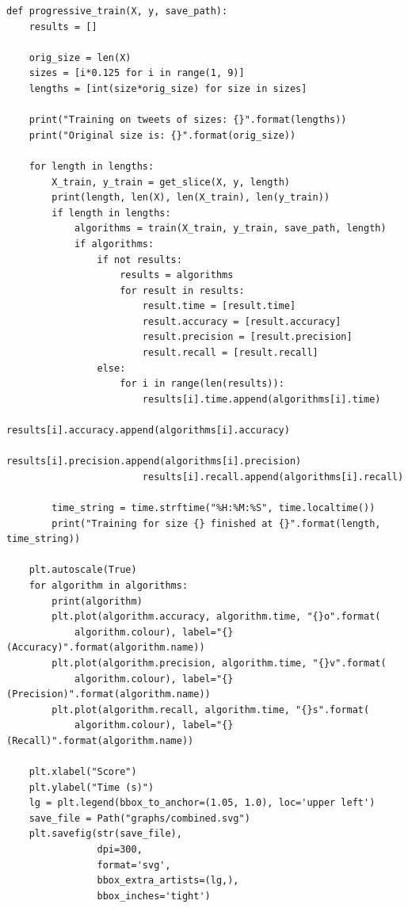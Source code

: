 \documentclass{article}
\begin{document}
\begin{lstlisting}[caption={Progressive Training function},captionpos=b]
def progressive_train(X, y, save_path):
    results = []

    orig_size = len(X)
    sizes = [i*0.125 for i in range(1, 9)]
    lengths = [int(size*orig_size) for size in sizes]

    print("Training on tweets of sizes: {}".format(lengths))
    print("Original size is: {}".format(orig_size))

    for length in lengths:
        X_train, y_train = get_slice(X, y, length)
        print(length, len(X), len(X_train), len(y_train))
        if length in lengths:
            algorithms = train(X_train, y_train, save_path, length)
            if algorithms:
                if not results:
                    results = algorithms
                    for result in results:
                        result.time = [result.time]
                        result.accuracy = [result.accuracy]
                        result.precision = [result.precision]
                        result.recall = [result.recall]
                else:
                    for i in range(len(results)):
                        results[i].time.append(algorithms[i].time)
                        results[i].accuracy.append(algorithms[i].accuracy)
                        results[i].precision.append(algorithms[i].precision)
                        results[i].recall.append(algorithms[i].recall)

        time_string = time.strftime("%H:%M:%S", time.localtime())
        print("Training for size {} finished at {}".format(length, time_string))

    plt.autoscale(True)
    for algorithm in algorithms:
        print(algorithm)
        plt.plot(algorithm.accuracy, algorithm.time, "{}o".format(
            algorithm.colour), label="{} (Accuracy)".format(algorithm.name))
        plt.plot(algorithm.precision, algorithm.time, "{}v".format(
            algorithm.colour), label="{} (Precision)".format(algorithm.name))
        plt.plot(algorithm.recall, algorithm.time, "{}s".format(
            algorithm.colour), label="{} (Recall)".format(algorithm.name))

    plt.xlabel("Score")
    plt.ylabel("Time (s)")
    lg = plt.legend(bbox_to_anchor=(1.05, 1.0), loc='upper left')
    save_file = Path("graphs/combined.svg")
    plt.savefig(str(save_file),
                dpi=300,
                format='svg',
                bbox_extra_artists=(lg,),
                bbox_inches='tight')
\end{lstlisting}
\end{document}
